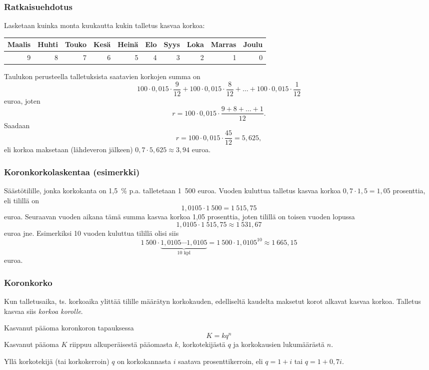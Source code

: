 \documentclass{beamer}\usepackage[]{graphicx}\usepackage[]{color}
\theoremstyle{remark}
\newtheorem{ratkaisu}{Ratkaisuehdotus}
\begin{document}
\begin{frame}
    \frametitle{Ratkaisuehdotus}
    Lasketaan kuinka monta kuukautta kukin talletus kasvaa korkoa:
    \begin{scriptsize}
\begin{table}[ht]
\centering
\begin{tabular}{rrrrrrrrrr}
  \hline
Maalis & Huhti & Touko & Kesä & Heinä & Elo & Syys & Loka & Marras & Joulu \\ 
  \hline
  9 &   8 &   7 &   6 &   5 &   4 &   3 &   2 &   1 &   0 \\ 
   \hline
\end{tabular}
\end{table}

    \end{scriptsize}
    \pause Taulukon perusteella talletuksista saatavien korkojen summa on
    \[
        100\cdot0,015\cdot\frac{9}{12}+100\cdot0,015\cdot\frac{8}{12}+\ldots+100\cdot0,015\cdot\frac{1}{12}
    \]
    euroa\pause, joten
    \[
        r =  100\cdot0,015\cdot\frac{9+8 +\dots+1}{12}.
    \]
    \pause Saadaan
    \[
        r = 100\cdot0,015\cdot\frac{45}{12} = 5{,}625,
    \]
    eli korkoa maksetaan (lähdeveron jälkeen) \(0,7\cdot5{,}625 \approx 3{,}94\) euroa.
\end{frame}

\begin{frame}
    \frametitle{Koronkorkolaskentaa (esimerkki)}
    \pause
    Säästötilille, jonka korkokanta on 1,5~\% p.a. talletetaan 1~500 euroa. \pause Vuoden kuluttua talletus kasvaa korkoa \(0,7\cdot 1,5 = 1{,}05\) prosenttia\pause, eli tilillä on 
    \[
        1{,}0105\cdot1~500 = 1~515{,}75
    \]
    euroa. \pause Seuraavan vuoden aikana tämä summa kasvaa korkoa 1{,}05 prosenttia, joten tilillä on toisen vuoden lopussa
    \[
        1{,}0105\cdot1~515{,}75 \approx 1~531{,}67
    \]
    euroa jne. \pause Esimerkiksi 10 vuoden kuluttua tilillä olisi siis
    \[
        1~500\cdot\underbrace{1{,}0105\cdots1{,}0105}_{10\text{ kpl}} = 1~500\cdot1{,}0105^{10} \approx 1~665{,}15
    \]
    euroa.
\end{frame}

\begin{frame}
    \frametitle{Koronkorko}
    \pause
    Kun talletusaika, ts. korkoaika ylittää tilille määrätyn korkokauden, edelliseltä kaudelta maksetut korot alkavat kasvaa korkoa. 
    \pause
    Talletus kasvaa siis \emph{korkoa korolle}.
    \pause
    \begin{block}{Kasvanut pääoma koronkoron tapauksessa}
        \[
            K = kq^n
        \]
        Kasvanut pääoma \(K\) riippuu alkuperäisestä pääomasta \(k\), korkotekijästä \(q\) ja korkokausien lukumäärästä \(n\).
    \end{block}
    Yllä korkotekijä (tai korkokerroin) \(q\) on korkokannasta \(i\) saatava prosenttikerroin, eli \(q = 1+i\) tai \(q = 1 + 0,7i\).
\end{frame}
\end{document}
